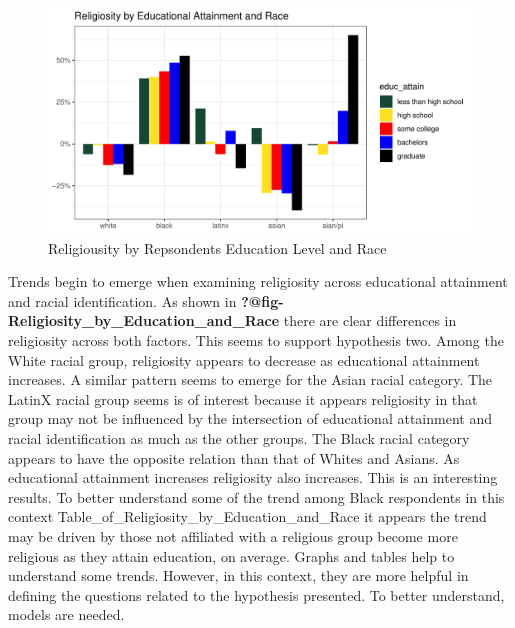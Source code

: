 \documentclass[
  12pt,
  letterpaper,
]{article}
\begin{document}
\begin{figure}[!t]

{\centering \includegraphics{main_manuscript_files/figure-pdf/unnamed-chunk-7-1.pdf}

}

\caption{Religiousity by Repsondents Education Level and Race}

\end{figure}

Trends begin to emerge when examining religiosity across educational
attainment and racial identification. As shown in
\textbf{?@fig-Religiosity\_by\_Education\_and\_Race} there are clear
differences in religiosity across both factors. This seems to support
hypothesis two. Among the White racial group, religiosity appears to
decrease as educational attainment increases. A similar pattern seems to
emerge for the Asian racial category. The LatinX racial group seems is
of interest because it appears religiosity in that group may not be
influenced by the intersection of educational attainment and racial
identification as much as the other groups. The Black racial category
appears to have the opposite relation than that of Whites and Asians. As
educational attainment increases religiosity also increases. This is an
interesting results. To better understand some of the trend among Black
respondents in this context
Table\_of\_Religiosity\_by\_Education\_and\_Race it appears the trend
may be driven by those not affiliated with a religious group become more
religious as they attain education, on average. Graphs and tables help
to understand some trends. However, in this context, they are more
helpful in defining the questions related to the hypothesis presented.
To better understand, models are needed.
\end{document}
